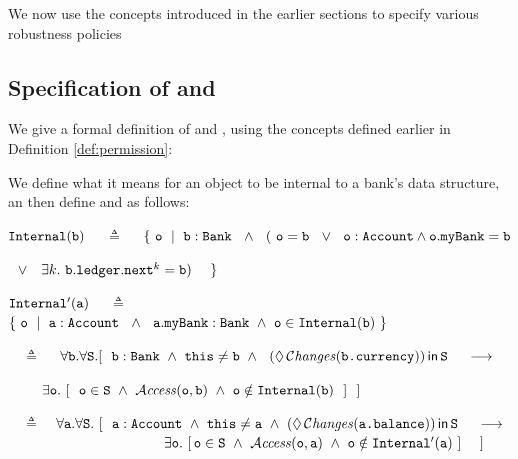 \documentclass[acmsmall,screen]{acmart}
\begin{document}
 We now use the concepts introduced in the earlier sections to specify various robustness policies

 \subsection{Specification of   and   }

We    give a formal definition of  and  , using the concepts defined earlier in  Definition \ref{def:permission}: %

\begin{definition}
\label{def:pol2}
We define  what it means for an object  to be internal to a bank's data structure, an then define   and     as follows:

${\mbox{\tt{Internal}}}({\mbox{\tt{b}}})$ \ \  $\triangleq$ \ \
$\{\ \prg{o}\ \mid\  \prg{b}:\prg{Bank}\ \ \wedge \ \ (\ \prg{o} = \prg{b}\ \ \vee\  \ \prg{o}:\prg{Account}\wedge \prg{o}.\prg{myBank}=\prg{b}$\\
\strut \hspace{7.3cm} $\ \ \vee\ \ \ \exists k. \ \prg{b}.\prg{ledger}.\prg{next}^k = \prg{b})\ \ \ \ \}$


${\mbox{\tt{Internal}}}'({\mbox{\tt{a}}})$ \ \  $\triangleq$ \ \
$\{\ \prg{o}\ \mid\  \prg{a}:\prg{Account}\ \ \wedge \ \
 \prg{a}.\prg{myBank} :\prg{Bank}\ \wedge\  \prg{o}\in \prg{Internal}(\prg{b})\ \}$


 \vspace{.2cm}

  \ \  $\triangleq$ \ \
  $\forall \prg{b}.\forall \prg{S}.
  [ \ \  \prg{b}:
  \prg{Bank}\ \wedge\ \prg{this}\neq\prg{b}\ \wedge\ \ \Using{(\Future\Changes{\prg{b.currency}})}{\prg{S}} \ \ \ \ \longrightarrow \ \  $\\
   \strut $~ $ \ \ \ \hspace{1.7in}  \hfill
 $\exists \prg{o}. \ [ \ \
  \prg{o}\in \prg{S}\   \wedge\  \CanAccess{\prg{o}}{\prg{b}}\ \wedge\     \prg{o}\notin\prg{Internal}(\prg{b})  \ \ ]\ \ ]$


 \vspace{.1cm}
    \Pol 4\ \  $\triangleq$\ \ $\forall \prg{a}.\forall \prg{S}.\ [ \ \  \prg{a}:\prg{Account}\   \wedge\   \prg{this}\neq\prg{a} \ \wedge\ \Using{(\Future\Changes{\prg{a.balance}})}{\prg{S}}\ \ \   \
    \longrightarrow$ \\
 $\strut \hspace{3.9cm} \hfill \exists \prg{o}.\ [\, \prg{o}\in \prg{S}\ \wedge \ \CanAccess{\prg{o}}{\prg{a}}\ \wedge  \ \prg{o} \notin\prg{Internal}'(\prg{a}) \ ] \ \ \ \ ]$

\end{definition}
\end{document}
